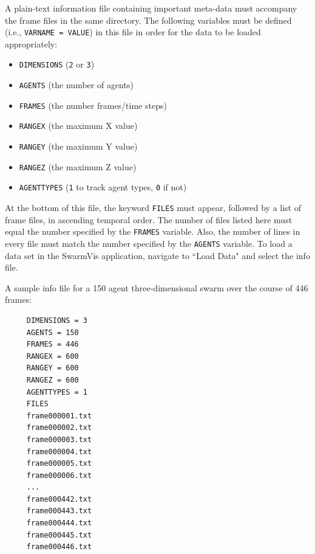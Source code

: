 \documentclass{vgtc}
\begin{document}
A plain-text information file containing important meta-data must accompany the frame files in the same directory.
The following variables must be defined (i.e., \texttt{VARNAME = VALUE}) in this file in order for the data to be loaded appropriately:
\begin{itemize}
\item \texttt{DIMENSIONS} (\texttt{2} or \texttt{3})
\item \texttt{AGENTS} (the number of agents)
\item \texttt{FRAMES} (the number frames/time steps)
\item \texttt{RANGEX} (the maximum X value)
\item \texttt{RANGEY} (the maximum Y value)
\item \texttt{RANGEZ} (the maximum Z value)
\item \texttt{AGENTTYPES} (\texttt{1} to track agent types, \texttt{0} if not)
\end{itemize}
At the bottom of this file, the keyword \texttt{FILES} must appear, followed by a list of frame files, in ascending
temporal order.
The number of files listed here must equal the number specified by the \texttt{FRAMES} variable.
Also, the number of lines in every file must match the number specified by the \texttt{AGENTS} variable.
To load a data set in the SwarmVis application, navigate to ``Load Data" and select the info file.

A sample info file for a 150 agent three-dimensional swarm over the course of 446 frames:


\begin{verbatim}
     DIMENSIONS = 3
     AGENTS = 150
     FRAMES = 446
     RANGEX = 600
     RANGEY = 600
     RANGEZ = 600
     AGENTTYPES = 1
     FILES
     frame000001.txt
     frame000002.txt
     frame000003.txt
     frame000004.txt
     frame000005.txt
     frame000006.txt
     ...
     frame000442.txt
     frame000443.txt
     frame000444.txt
     frame000445.txt
     frame000446.txt
\end{verbatim}
\end{document}
